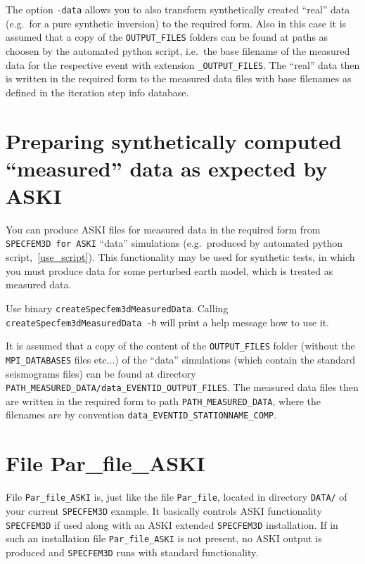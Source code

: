 \documentclass[12pt,a4paper]{article}
\newcommand{\lcode}[1]{\nolinkurl{#1}}
\newcommand{\lcodetitle}[1]{ {\ttfamily #1} }
\newcommand{\ASKI}{ {\ttfamily ASKI} }
\begin{document}
The option \lcode{-data} allows you to also transform synthetically created ``real'' data (e.g.\ for a 
pure synthetic inversion) to the required form. Also in this case it is assumed that a copy of the 
\lcode{OUTPUT_FILES} folders can be found at paths as choosen by the automated python script, i.e.\ the base
filename of the measured data for the respective event with extension \lcode{_OUTPUT_FILES}. The ``real'' data 
then is written in the required form to the measured data files with base filenames as defined in the iteration step 
info database. 
%
\section{Preparing synthetically computed ``measured'' data as expected by \lcodetitle{ASKI}}
%
You can produce \ASKI files for measured data in the required form from \lcode{SPECFEM3D for ASKI} ``data'' 
simulations (e.g.\ produced by automated python script,~\ref{use_script}). This functionality may
be used for synthetic tests, in which you must produce data for some perturbed earth model, which 
is treated as measured data.

Use binary \lcode{createSpecfem3dMeasuredData}. Calling \lcode{createSpecfem3dMeasuredData -h} will print a
help message how to use it.

It is assumed that a copy of the content of the \lcode{OUTPUT_FILES} folder (without the \lcode{MPI_DATABASES} files etc...)
of the ``data'' simulations (which contain the standard seismograms files) can be found at 
directory \lcode{PATH_MEASURED_DATA/data_EVENTID_OUTPUT_FILES}. 
The measured data files then are written in the required form to path \lcode{PATH_MEASURED_DATA}, where the filenames are by
convention \lcode{data_EVENTID_STATIONNAME_COMP}.  
%
\section{File \lcodetitle{Par\_file\_ASKI}} \label{file_Par_file_ASKI}
%
File \lcode{Par_file_ASKI} is, just like the file \lcode{Par_file}, located in directory 
\lcode{DATA/} of your current \lcode{SPECFEM3D} example. It basically controls \ASKI functionality 
\lcode{SPECFEM3D} if used along with an \ASKI extended \lcode{SPECFEM3D} installation. If in such an 
installation file \lcode{Par_file_ASKI} is not present, no \ASKI output is produced and 
\lcode{SPECFEM3D} runs with standard functionality. 
\end{document}

